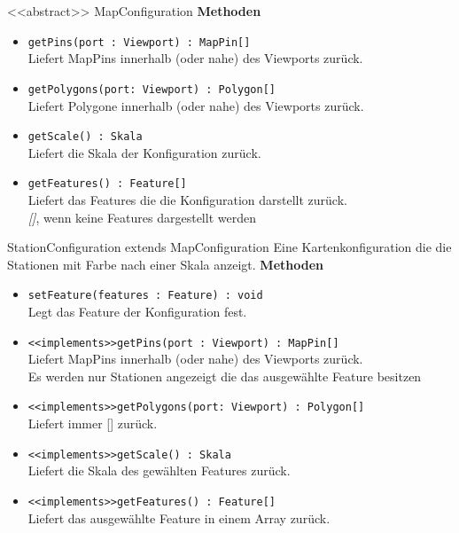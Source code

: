     \begin{Class}{<<abstract>> MapConfiguration}
        \textbf{Methoden}
        \begin{itemize}
            \item \texttt{getPins(port : Viewport) : MapPin[]}
            \\ Liefert MapPins innerhalb (oder nahe) des Viewports zurück.
            \item \texttt{getPolygons(port: Viewport) : Polygon[]}
            \\ Liefert Polygone innerhalb (oder nahe) des Viewports zurück.
            \item \texttt{getScale() : Skala}
            \\ Liefert die Skala der Konfiguration zurück.
            \item \texttt{getFeatures() : Feature[]}
            \\ Liefert das Features die die Konfiguration darstellt zurück.
            \\ \emph{[]}, wenn keine Features dargestellt werden
        \end{itemize}
    \end{Class}

    \begin{Class}{StationConfiguration extends MapConfiguration}
        Eine Kartenkonfiguration die die Stationen mit Farbe nach einer Skala anzeigt.
        \textbf{Methoden}
        \begin{itemize}
            \item \texttt{setFeature(features : Feature) : void}
            \\ Legt das Feature der Konfiguration fest.
            \item \texttt{<<implements>>getPins(port : Viewport) : MapPin[]}
            \\ Liefert MapPins innerhalb (oder nahe) des Viewports zurück.
            \\ Es werden nur Stationen angezeigt die das ausgewählte Feature besitzen
            \item \texttt{<<implements>>getPolygons(port: Viewport) : Polygon[]}
            \\ Liefert immer [] zurück.
            \item \texttt{<<implements>>getScale() : Skala}
            \\ Liefert die Skala des gewählten Features zurück.
            \item \texttt{<<implements>>getFeatures() : Feature[]}
            \\ Liefert das ausgewählte Feature in einem Array zurück.
        \end{itemize}
    \end{Class}

